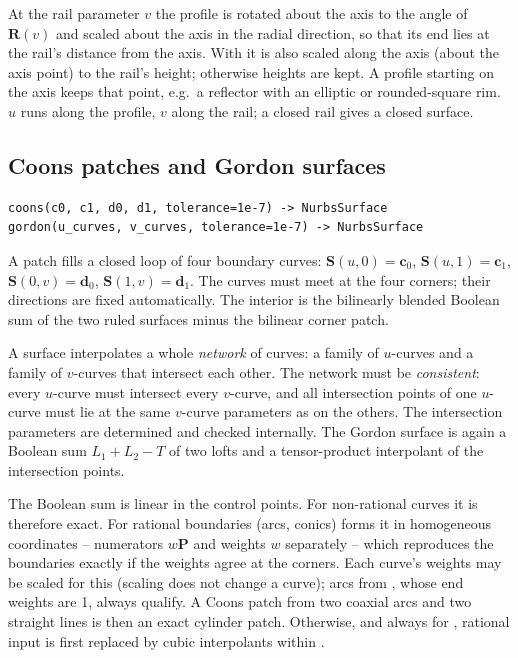 At the rail parameter $v$ the profile is rotated about the axis to the angle of
$\mathbf R(v)$ and scaled about the axis in the radial direction, so that its end lies at the
rail's distance from the axis. With  it is also scaled along the axis (about
the axis point) to the rail's height; otherwise heights are kept. A profile starting on the axis
keeps that point, e.g.\ a reflector with an elliptic or rounded-square rim. $u$ runs along the
profile, $v$ along the rail; a closed rail gives a closed surface.


\subsection{Coons patches and Gordon surfaces}

\begin{lstlisting}[style=text]
coons(c0, c1, d0, d1, tolerance=1e-7) -> NurbsSurface
gordon(u_curves, v_curves, tolerance=1e-7) -> NurbsSurface
\end{lstlisting}

A  patch fills a closed loop of four boundary curves: $\mathbf S(u,0) =
\mathbf c_0$, $\mathbf S(u,1) = \mathbf c_1$, $\mathbf S(0,v) = \mathbf d_0$, $\mathbf S(1,v) =
\mathbf d_1$. The curves must meet at the four corners; their directions are fixed
automatically. The interior is the bilinearly blended Boolean sum of the two ruled surfaces minus
the bilinear corner patch.

A  surface interpolates a whole \emph{network} of curves: a family of
$u$-curves and a family of $v$-curves that intersect each other. The network must be
\emph{consistent}: every $u$-curve must intersect every $v$-curve, and all intersection points of
one $u$-curve must lie at the same $v$-curve parameters as on the others. The intersection
parameters are determined and checked internally. The Gordon surface is again a Boolean sum
$L_1 + L_2 - T$ of two lofts and a tensor-product interpolant of the intersection points.

The Boolean sum is linear in the control points. For non-rational curves it is therefore
exact. For rational boundaries (arcs, conics)  forms it in homogeneous coordinates
-- numerators $w\mathbf P$ and weights $w$ separately -- which reproduces the boundaries
exactly if the weights agree at the corners. Each curve's weights may be scaled for this
(scaling does not change a curve); arcs from , whose end weights are 1, always
qualify. A Coons patch from two coaxial arcs and two straight lines is then an exact cylinder
patch. Otherwise, and always for , rational input is first replaced by cubic
interpolants within .

